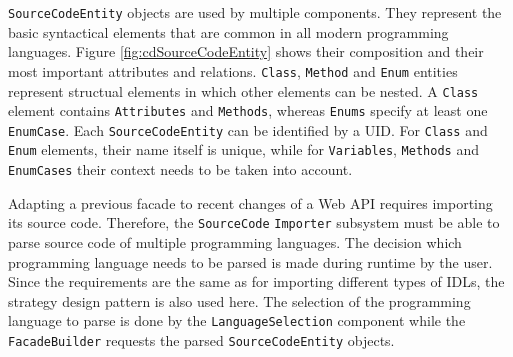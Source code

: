 \texttt{SourceCodeEntity} objects are used by multiple components. They represent the basic syntactical elements that are common in all modern programming languages. Figure \ref{fig:cdSourceCodeEntity} shows their composition and their most important attributes and relations. \texttt{Class}, \texttt{Method} and \texttt{Enum} entities represent structual elements in which other elements can be nested. A \texttt{Class} element contains \texttt{Attributes} and \texttt{Methods}, whereas \texttt{Enums} specify at least one \texttt{EnumCase}. Each \texttt{Source\-Code\-Entity} can be identified by a \ac{UID}. For \texttt{Class} and \texttt{Enum} elements, their name itself is unique, while for \texttt{Variables}, \texttt{Methods} and \texttt{EnumCases} their context needs to be taken into account.

\begin{figure}[!h]
\end{figure}

Adapting a previous facade to recent changes of a Web API requires importing its source code. Therefore, the \texttt{SourceCode} \texttt{Importer} subsystem must be able to parse source code of multiple programming languages. The decision which programming language needs to be parsed is made during runtime by the user. Since the requirements are the same as for importing different types of \acp{IDL}, the strategy design pattern is also used here. The selection of the programming language to parse is done by the \texttt{Language\-Selection} component while the \texttt{Facade\-Builder} requests the parsed \texttt{Source\-Code\-Entity} objects.


